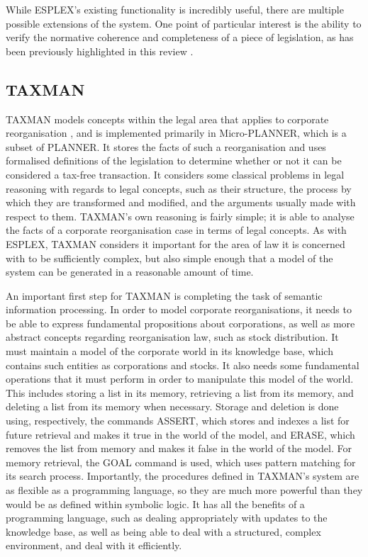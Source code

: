\documentclass{l4proj}
\begin{document}
While ESPLEX's existing functionality is incredibly useful, there are multiple possible extensions of the system. One point of particular interest is the ability to verify the normative coherence and completeness of a piece of legislation, as has been previously highlighted in this review \cite{Powers}. 

\subsection{TAXMAN}
TAXMAN models concepts within the legal area that applies to corporate reorganisation \cite{TAXMAN}, and is implemented primarily in Micro-PLANNER, which is a subset of PLANNER. It stores the facts of such a reorganisation and uses formalised definitions of the legislation to determine whether or not it can be considered a tax-free transaction. It considers some classical problems in legal reasoning with regards to legal concepts, such as their structure, the process by which they are transformed and modified, and the arguments usually made with respect to them. TAXMAN's own reasoning is fairly simple; it is able to analyse the facts of a corporate reorganisation case in terms of legal concepts. As with ESPLEX, TAXMAN considers it important for the area of law it is concerned with to be sufficiently complex, but also simple enough that a model of the system can be generated in a reasonable amount of time. 

An important first step for TAXMAN is completing the task of semantic information processing. In order to model corporate reorganisations, it needs to be able to express fundamental propositions about corporations, as well as more abstract concepts regarding reorganisation law, such as stock distribution. It must maintain a model of the corporate world in its knowledge base, which contains such entities as corporations and stocks. It also needs some fundamental operations that it must perform in order to manipulate this model of the world. This includes storing a list in its memory, retrieving a list from its memory, and deleting a list from its memory when necessary. Storage and deletion is done using, respectively, the commands ASSERT, which stores and indexes a list for future retrieval and makes it true in the world of the model, and ERASE, which removes the list from memory and makes it false in the world of the model. For memory retrieval, the GOAL command is used, which uses pattern matching for its search process. Importantly, the procedures defined in TAXMAN's system are as flexible as a programming language, so they are much more powerful than they would be as defined within symbolic logic. It has all the benefits of a programming language, such as dealing appropriately with updates to the knowledge base, as well as being able to deal with a structured, complex environment, and deal with it efficiently. 
\end{document}
